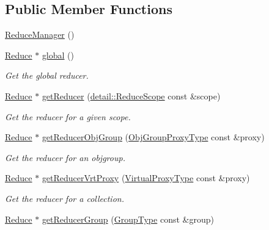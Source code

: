 \subsection*{Public Member Functions}
\begin{DoxyCompactItemize}
\item 
\hyperlink{structvt_1_1collective_1_1reduce_1_1_reduce_manager_a28e777d1b70bc4e2d369db4ed3df76ab}{Reduce\+Manager} ()
\item 
\hyperlink{structvt_1_1collective_1_1reduce_1_1_reduce}{Reduce} $\ast$ \hyperlink{structvt_1_1collective_1_1reduce_1_1_reduce_manager_afa3c814ff0e1c7ef1a9f76ed4036512b}{global} ()
\begin{DoxyCompactList}\small\item\em Get the global reducer. \end{DoxyCompactList}\item 
\hyperlink{structvt_1_1collective_1_1reduce_1_1_reduce}{Reduce} $\ast$ \hyperlink{structvt_1_1collective_1_1reduce_1_1_reduce_manager_ad502c08497db1a1d811e1cad034f4891}{get\+Reducer} (\hyperlink{structvt_1_1collective_1_1reduce_1_1detail_1_1_reduce_scope}{detail\+::\+Reduce\+Scope} const \&scope)
\begin{DoxyCompactList}\small\item\em Get the reducer for a given scope. \end{DoxyCompactList}\item 
\hyperlink{structvt_1_1collective_1_1reduce_1_1_reduce}{Reduce} $\ast$ \hyperlink{structvt_1_1collective_1_1reduce_1_1_reduce_manager_a712bf763fda2a663e87edc524f99839f}{get\+Reducer\+Obj\+Group} (\hyperlink{namespacevt_ad7cae989df485fccca57f0792a880a8e}{Obj\+Group\+Proxy\+Type} const \&proxy)
\begin{DoxyCompactList}\small\item\em Get the reducer for an objgroup. \end{DoxyCompactList}\item 
\hyperlink{structvt_1_1collective_1_1reduce_1_1_reduce}{Reduce} $\ast$ \hyperlink{structvt_1_1collective_1_1reduce_1_1_reduce_manager_aa6a24ee9cccbc984031bc834471429a9}{get\+Reducer\+Vrt\+Proxy} (\hyperlink{namespacevt_a1b417dd5d684f045bb58a0ede70045ac}{Virtual\+Proxy\+Type} const \&proxy)
\begin{DoxyCompactList}\small\item\em Get the reducer for a collection. \end{DoxyCompactList}\item 
\hyperlink{structvt_1_1collective_1_1reduce_1_1_reduce}{Reduce} $\ast$ \hyperlink{structvt_1_1collective_1_1reduce_1_1_reduce_manager_afedfe0dbb9fcbe6120a310ac8f4ad9b0}{get\+Reducer\+Group} (\hyperlink{namespacevt_a27b5e4411c9b6140c49100e050e2f743}{Group\+Type} const \&group)

\end{DoxyCompactItemize}
